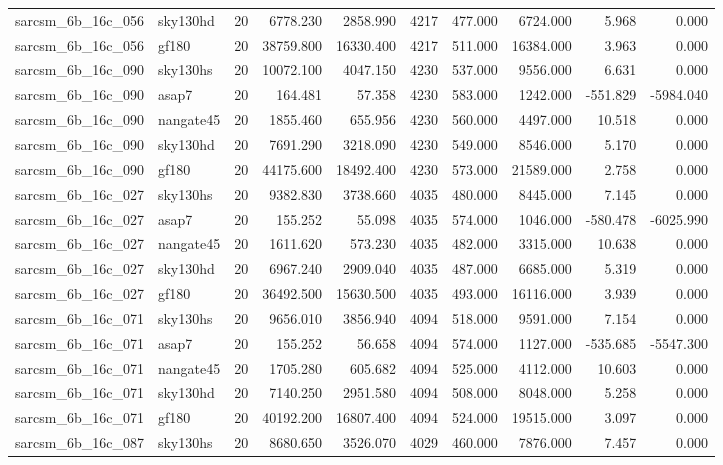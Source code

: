 \begin{longtable}{llrrrrrrrr}
sarcsm\_6b\_16c\_056 & sky130hd & 20 & 6778.230 & 2858.990 & 4217 & 477.000 & 6724.000 & 5.968 & 0.000 \\
sarcsm\_6b\_16c\_056 & gf180 & 20 & 38759.800 & 16330.400 & 4217 & 511.000 & 16384.000 & 3.963 & 0.000 \\
sarcsm\_6b\_16c\_090 & sky130hs & 20 & 10072.100 & 4047.150 & 4230 & 537.000 & 9556.000 & 6.631 & 0.000 \\
sarcsm\_6b\_16c\_090 & asap7 & 20 & 164.481 & 57.358 & 4230 & 583.000 & 1242.000 & -551.829 & -5984.040 \\
sarcsm\_6b\_16c\_090 & nangate45 & 20 & 1855.460 & 655.956 & 4230 & 560.000 & 4497.000 & 10.518 & 0.000 \\
sarcsm\_6b\_16c\_090 & sky130hd & 20 & 7691.290 & 3218.090 & 4230 & 549.000 & 8546.000 & 5.170 & 0.000 \\
sarcsm\_6b\_16c\_090 & gf180 & 20 & 44175.600 & 18492.400 & 4230 & 573.000 & 21589.000 & 2.758 & 0.000 \\
sarcsm\_6b\_16c\_027 & sky130hs & 20 & 9382.830 & 3738.660 & 4035 & 480.000 & 8445.000 & 7.145 & 0.000 \\
sarcsm\_6b\_16c\_027 & asap7 & 20 & 155.252 & 55.098 & 4035 & 574.000 & 1046.000 & -580.478 & -6025.990 \\
sarcsm\_6b\_16c\_027 & nangate45 & 20 & 1611.620 & 573.230 & 4035 & 482.000 & 3315.000 & 10.638 & 0.000 \\
sarcsm\_6b\_16c\_027 & sky130hd & 20 & 6967.240 & 2909.040 & 4035 & 487.000 & 6685.000 & 5.319 & 0.000 \\
sarcsm\_6b\_16c\_027 & gf180 & 20 & 36492.500 & 15630.500 & 4035 & 493.000 & 16116.000 & 3.939 & 0.000 \\
sarcsm\_6b\_16c\_071 & sky130hs & 20 & 9656.010 & 3856.940 & 4094 & 518.000 & 9591.000 & 7.154 & 0.000 \\
sarcsm\_6b\_16c\_071 & asap7 & 20 & 155.252 & 56.658 & 4094 & 574.000 & 1127.000 & -535.685 & -5547.300 \\
sarcsm\_6b\_16c\_071 & nangate45 & 20 & 1705.280 & 605.682 & 4094 & 525.000 & 4112.000 & 10.603 & 0.000 \\
sarcsm\_6b\_16c\_071 & sky130hd & 20 & 7140.250 & 2951.580 & 4094 & 508.000 & 8048.000 & 5.258 & 0.000 \\
sarcsm\_6b\_16c\_071 & gf180 & 20 & 40192.200 & 16807.400 & 4094 & 524.000 & 19515.000 & 3.097 & 0.000 \\
sarcsm\_6b\_16c\_087 & sky130hs & 20 & 8680.650 & 3526.070 & 4029 & 460.000 & 7876.000 & 7.457 & 0.000 \\

\end{longtable}
